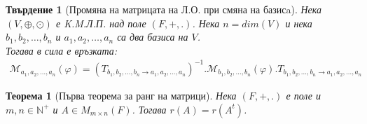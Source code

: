 \documentclass[12pt]{article}
\newtheorem{theorem}{Теорема}%
\newtheorem{proposition}{Твърдение}%
\begin{document}
\begin{proposition}[Промяна на матрицата на Л.О. при смяна на базисa]
Нека \((V, \oplus, \odot)\) е K.M.Л.П. над поле \((F, +, .)\).
Нека \(n = dim(V)\) и нека
\(b_1, b_2, \dots, b_n\) и \(a_1, a_2, \dots, a_n\) са два базиса на \(V\). \\
Тогава в сила е връзката:
\begin{align*}
\mathcal{M}_{a_1, a_2, \dots, a_n}(\varphi)
=
\left(T_{b_1, b_2, \dots, b_n \to a_1, a_2, \dots, a_n}\right)^{-1}
.
\mathcal{M}_{b_1, b_2, \dots, b_n}(\varphi)
.
T_{b_1, b_2, \dots, b_n \to a_1, a_2, \dots, a_n}
\end{align*}
\end{proposition}

\begin{theorem}[Първа теорема за ранг на матрици]
Нека \((F, +, .)\) е поле и \(m, n \in \mathbb{N}^+\) и \(A \in M_{m \times n}(F)\).
Тогава \(r(A) = r(A^t)\).
\end{theorem}
\end{document}
